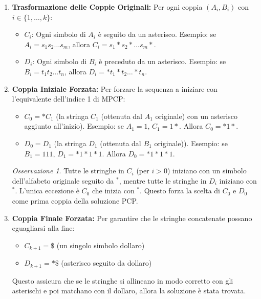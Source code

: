 \documentclass[a4paper]{article}
\theoremstyle{definition} %
\theoremstyle{remark} %
\newtheorem{remark}{Osservazione}
\begin{document}
\begin{enumerate}
    \item \textbf{Trasformazione delle Coppie Originali:}
    Per ogni coppia $(A_i, B_i)$ con $i \in \{1, \dots, k\}$:
    \begin{itemize}
        \item $C_i$: Ogni simbolo di $A_i$ è seguito da un asterisco.
              Esempio: se $A_i = s_1 s_2 \dots s_m$, allora $C_i = s_1 * s_2 * \dots s_m *$.
        \item $D_i$: Ogni simbolo di $B_i$ è preceduto da un asterisco.
              Esempio: se $B_i = t_1 t_2 \dots t_n$, allora $D_i = * t_1 * t_2 \dots * t_n$.
    \end{itemize}

    \item \textbf{Coppia Iniziale Forzata:}
    Per forzare la sequenza a iniziare con l'equivalente dell'indice 1 di MPCP:
    \begin{itemize}
        \item $C_0 = * C_1$ (la stringa $C_1$ (ottenuta dal $A_1$ originale) con un asterisco aggiunto all'inizio).
              Esempio: se $A_1 = 1$, $C_1 = 1*$. Allora $C_0 = *1*$.
        \item $D_0 = D_1$ (la stringa $D_1$ (ottenuta dal $B_1$ originale)).
              Esempio: se $B_1 = 111$, $D_1 = *1*1*1$. Allora $D_0 = *1*1*1$.
    \end{itemize}
    \begin{remark}
    Tutte le stringhe in $C_i$ (per $i>0$) iniziano con un simbolo dell'alfabeto originale seguito da $^*$, mentre tutte le stringhe in $D_i$ iniziano con $^*$. L'unica eccezione è $C_0$ che inizia con $^*$. Questo forza la scelta di $C_0$ e $D_0$ come prima coppia della soluzione PCP.
    \end{remark}

    \item \textbf{Coppia Finale Forzata:}
    Per garantire che le stringhe concatenate possano eguagliarsi alla fine:
    \begin{itemize}
        \item $C_{k+1} = \$$ (un singolo simbolo dollaro)
        \item $D_{k+1} = *\$$ (asterisco seguito da dollaro)
    \end{itemize}
    Questo assicura che se le stringhe si allineano in modo corretto con gli asterischi e poi matchano con il dollaro, allora la soluzione è stata trovata.
\end{enumerate}
\end{document}
